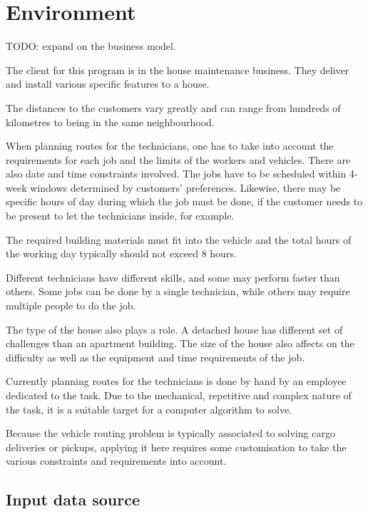 \chapter{Environment}
\label{chapter:environment}

TODO: expand on the business model. 

The client for this program is in the house maintenance business. They deliver and install various specific features to a house.

The distances to the customers vary greatly and can range from hundreds of kilometres to being in the same neighbourhood.  

When planning routes for the technicians, one has to take into account the requirements for each job and the limits of the workers and vehicles. There are also date and time constraints involved. The jobs have to be scheduled within 4-week windows determined by customers' preferences. Likewise, there may be specific hours of day during which the job must be done, if the customer needs to be present to let the technicians inside, for example. 

The required building materials must fit into the vehicle and the total hours of the working day typically should not exceed 8 hours. 

Different technicians have different skills, and some may perform faster than others. Some jobs can be done by a single technician, while others may require multiple people to do the job. 

The type of the house also plays a role. A detached house has different set of challenges than an apartment building. The size of the house also affects on the difficulty as well as the equipment and time requirements of the job.

Currently planning routes for the technicians is done by hand by an employee dedicated to the task. Due to the mechanical, repetitive and complex nature of the task, it is a suitable target for a computer algorithm to solve.

Because the vehicle routing problem is typically associated to solving cargo deliveries or pickups, applying it here requires some customisation to take the various constraints and requirements into account. 

\section{Input data source}
\label{subsection:dataconversion}

